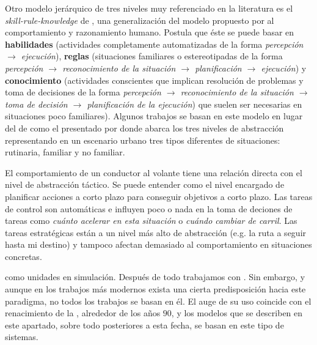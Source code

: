 Otro modelo jerárquico de tres niveles muy referenciado en la literatura es el \textit{skill-rule-knowledge} de \cite{Rasmussen1986}, una generalización del modelo propuesto por \cite{michon1985critical} al comportamiento y razonamiento humano. Postula que éste se puede basar en \textbf{habilidades} (actividades completamente automatizadas de la forma \textit{percepción $\rightarrow$ ejecución}), \textbf{reglas} (situaciones familiares o estereotipadas de la forma \textit{percepción $\rightarrow$ reconocimiento de la situación $\rightarrow$ planificación $\rightarrow$ ejecución}) y \textbf{conocimiento} (actividades conscientes que implican resolución de problemas y toma de decisiones de la forma \textit{percepción $\rightarrow$ reconocimiento de la situación $\rightarrow$ toma de decisión $\rightarrow$ planificación de la ejecución}) que suelen ser necesarias en situaciones poco familiares). Algunos trabajos se basan en este modelo en lugar del de \cite{michon1985critical} como el presentado por \cite{Chaib-draa1994} donde abarca los tres niveles de abstracción representando en un escenario urbano tres tipos diferentes de situaciones: rutinaria, familiar y no familiar.

El comportamiento de un conductor al volante tiene una relación directa con el nivel de abstracción táctico. Se puede entender como el nivel encargado de planificar acciones a corto plazo para conseguir objetivos a corto plazo. Las tareas de control son automáticas e influyen poco o nada en la toma de deciones de tareas como \textit{cuánto acelerar en esta situación} o \textit{cuándo cambiar de carril}. Las tareas estratégicas están a un nivel más alto de abstracción (e.g. la ruta a seguir hasta mi destino) y tampoco afectan demasiado al comportamiento en situaciones concretas.

 como unidades en simulación. Después de todo trabajamos con . Sin embargo, y aunque en los trabajos más modernos exista una cierta predisposición hacia este paradigma, no todos los trabajos se basan en él. El auge de su uso coincide con el renacimiento de la , alrededor de los años $90$, y los modelos que se describen en este apartado, sobre todo posteriores a esta fecha, se basan en este tipo de sistemas.

